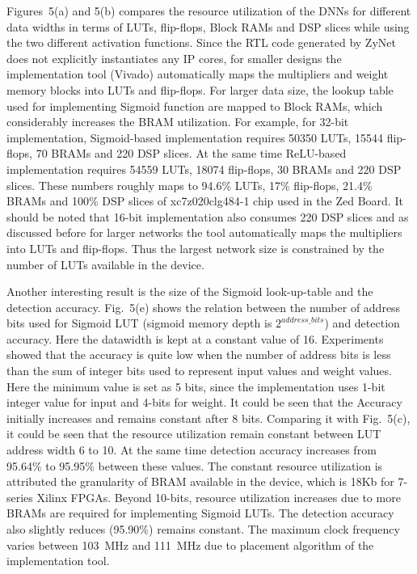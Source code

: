 Figures~5(a) and 5(b) compares the resource utilization of the DNNs for different data widths in terms of LUTs, flip-flops, Block RAMs and DSP slices while using the two different activation functions.
Since the RTL code generated by ZyNet does not explicitly instantiates any IP cores, for smaller designs the implementation tool (Vivado) automatically maps the multipliers and weight memory blocks into LUTs and flip-flops.
For larger data size, the lookup table used for implementing Sigmoid function are mapped to Block RAMs, which considerably increases the BRAM utilization.
For example, for 32-bit implementation, Sigmoid-based implementation requires 50350 LUTs, 15544 flip-flops, 70 BRAMs and 220 DSP slices.
At the same time ReLU-based implementation requires 54559 LUTs, 18074 flip-flops, 30 BRAMs and 220 DSP slices.
These numbers roughly maps to 94.6\% LUTs, 17\% flip-flops, 21.4\% BRAMs and 100\% DSP slices of xc7z020clg484-1 chip used in the Zed Board.
It should be noted that 16-bit implementation also consumes 220 DSP slices and as discussed before for larger networks the tool automatically maps the multipliers into LUTs and flip-flops.
Thus the largest network size is constrained by the number of LUTs available in the device. 

Another interesting result is the size of the Sigmoid look-up-table and the detection accuracy.
Fig.~5(e) shows the relation between the number of address bits used for Sigmoid LUT (sigmoid memory depth is $2^{address \_bits}$) and detection accuracy.
Here the datawidth is kept at a constant value of 16.
Experiments showed that the accuracy is quite low when the number of address bits is less than the sum of integer bits used to represent input values and weight values.
Here the minimum value is set as 5 bits, since the implementation uses 1-bit integer value for input and 4-bits for weight.
It could be seen that the Accuracy initially increases and remains constant after 8 bits.
Comparing it with Fig.~5(c), it could be seen that the resource utilization remain constant between LUT address width 6 to 10.
At the same time detection accuracy increases from 95.64\% to 95.95\% between these values.
The constant resource utilization is attributed the granularity of BRAM available in the device, which is 18Kb for 7-series Xilinx FPGAs.
Beyond 10-bits, resource utilization increases due to more BRAMs are required for implementing Sigmoid LUTs.
The detection accuracy also slightly reduces (95.90\%) remains constant.
The maximum clock frequency varies between 103~MHz and 111~MHz due to placement algorithm of the implementation tool.

